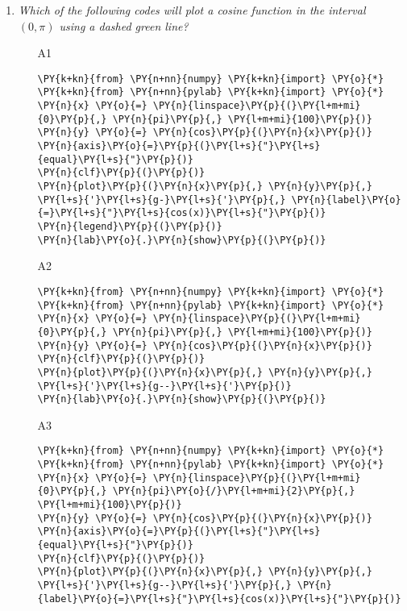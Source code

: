 \begin{enumerate}
\vspace{6mm}

\item {\em Which of the following codes will plot a cosine function 
in the interval $(0, \pi)$ using a dashed green line?}\\

\begin{enumerate}
\item[A1] 
\begin{Verbatim}[commandchars=\\\{\}]
\PY{k+kn}{from} \PY{n+nn}{numpy} \PY{k+kn}{import} \PY{o}{*}
\PY{k+kn}{from} \PY{n+nn}{pylab} \PY{k+kn}{import} \PY{o}{*}
\PY{n}{x} \PY{o}{=} \PY{n}{linspace}\PY{p}{(}\PY{l+m+mi}{0}\PY{p}{,} \PY{n}{pi}\PY{p}{,} \PY{l+m+mi}{100}\PY{p}{)}
\PY{n}{y} \PY{o}{=} \PY{n}{cos}\PY{p}{(}\PY{n}{x}\PY{p}{)}
\PY{n}{axis}\PY{o}{=}\PY{p}{(}\PY{l+s}{"}\PY{l+s}{equal}\PY{l+s}{"}\PY{p}{)}
\PY{n}{clf}\PY{p}{(}\PY{p}{)}
\PY{n}{plot}\PY{p}{(}\PY{n}{x}\PY{p}{,} \PY{n}{y}\PY{p}{,} \PY{l+s}{'}\PY{l+s}{g-}\PY{l+s}{'}\PY{p}{,} \PY{n}{label}\PY{o}{=}\PY{l+s}{"}\PY{l+s}{cos(x)}\PY{l+s}{"}\PY{p}{)}
\PY{n}{legend}\PY{p}{(}\PY{p}{)}
\PY{n}{lab}\PY{o}{.}\PY{n}{show}\PY{p}{(}\PY{p}{)}
\end{Verbatim}
\item[A2] 
\begin{Verbatim}[commandchars=\\\{\}]
\PY{k+kn}{from} \PY{n+nn}{numpy} \PY{k+kn}{import} \PY{o}{*}
\PY{k+kn}{from} \PY{n+nn}{pylab} \PY{k+kn}{import} \PY{o}{*}
\PY{n}{x} \PY{o}{=} \PY{n}{linspace}\PY{p}{(}\PY{l+m+mi}{0}\PY{p}{,} \PY{n}{pi}\PY{p}{,} \PY{l+m+mi}{100}\PY{p}{)}
\PY{n}{y} \PY{o}{=} \PY{n}{cos}\PY{p}{(}\PY{n}{x}\PY{p}{)}
\PY{n}{clf}\PY{p}{(}\PY{p}{)}
\PY{n}{plot}\PY{p}{(}\PY{n}{x}\PY{p}{,} \PY{n}{y}\PY{p}{,} \PY{l+s}{'}\PY{l+s}{g--}\PY{l+s}{'}\PY{p}{)}
\PY{n}{lab}\PY{o}{.}\PY{n}{show}\PY{p}{(}\PY{p}{)}
\end{Verbatim}
\item[A3] 
\begin{Verbatim}[commandchars=\\\{\}]
\PY{k+kn}{from} \PY{n+nn}{numpy} \PY{k+kn}{import} \PY{o}{*}
\PY{k+kn}{from} \PY{n+nn}{pylab} \PY{k+kn}{import} \PY{o}{*}
\PY{n}{x} \PY{o}{=} \PY{n}{linspace}\PY{p}{(}\PY{l+m+mi}{0}\PY{p}{,} \PY{n}{pi}\PY{o}{/}\PY{l+m+mi}{2}\PY{p}{,} \PY{l+m+mi}{100}\PY{p}{)}
\PY{n}{y} \PY{o}{=} \PY{n}{cos}\PY{p}{(}\PY{n}{x}\PY{p}{)}
\PY{n}{axis}\PY{o}{=}\PY{p}{(}\PY{l+s}{"}\PY{l+s}{equal}\PY{l+s}{"}\PY{p}{)}
\PY{n}{clf}\PY{p}{(}\PY{p}{)}
\PY{n}{plot}\PY{p}{(}\PY{n}{x}\PY{p}{,} \PY{n}{y}\PY{p}{,} \PY{l+s}{'}\PY{l+s}{g--}\PY{l+s}{'}\PY{p}{,} \PY{n}{label}\PY{o}{=}\PY{l+s}{"}\PY{l+s}{cos(x)}\PY{l+s}{"}\PY{p}{)}

\end{Verbatim}
\end{enumerate}
\end{enumerate}
